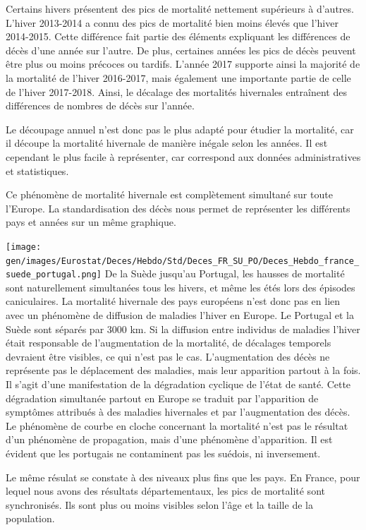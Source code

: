 \documentclass[
]{article}
\begin{document}
Certains hivers présentent des pics de mortalité nettement supérieurs à
d'autres. L'hiver 2013-2014 a connu des pics de mortalité bien moins
élevés que l'hiver 2014-2015. Cette différence fait partie des éléments
expliquant les différences de décès d'une année sur l'autre. De plus,
certaines années les pics de décès peuvent être plus ou moins précoces
ou tardifs. L'année 2017 supporte ainsi la majorité de la mortalité de
l'hiver 2016-2017, mais également une importante partie de celle de
l'hiver 2017-2018. Ainsi, le décalage des mortalités hivernales
entraînent des différences de nombres de décès sur l'année.

Le découpage annuel n'est donc pas le plus adapté pour étudier la
mortalité, car il découpe la mortalité hivernale de manière inégale
selon les années. Il est cependant le plus facile à représenter, car
correspond aux données administratives et statistiques.

Ce phénomène de mortalité hivernale est complètement simultané sur toute
l'Europe. La standardisation des décès nous permet de représenter les
différents pays et années sur un même graphique.

\texttt{[image: gen/images/Eurostat/Deces/Hebdo/Std/Deces\_FR\_SU\_PO/Deces\_Hebdo\_france\_suede\_portugal.png]}
De la Suède jusqu'au Portugal, les hausses de mortalité sont
naturellement simultanées tous les hivers, et même les étés lors des
épisodes caniculaires. La mortalité hivernale des pays européens n'est
donc pas en lien avec un phénomène de diffusion de maladies l'hiver en
Europe. Le Portugal et la Suède sont séparés par 3000 km. Si la
diffusion entre individus de maladies l'hiver était responsable de
l'augmentation de la mortalité, de décalages temporels devraient être
visibles, ce qui n'est pas le cas. L'augmentation des décès ne
représente pas le déplacement des maladies, mais leur apparition partout
à la fois. Il s'agit d'une manifestation de la dégradation cyclique de
l'état de santé. Cette dégradation simultanée partout en Europe se
traduit par l'apparition de symptômes attribués à des maladies
hivernales et par l'augmentation des décès. Le phénomène de courbe en
cloche concernant la mortalité n'est pas le résultat d'un phénomène de
propagation, mais d'une phénomène d'apparition. Il est évident que les
portugais ne contaminent pas les suédois, ni inversement.

Le même résulat se constate à des niveaux plus fins que les pays. En
France, pour lequel nous avons des résultats départementaux, les pics de
mortalité sont synchronisés. Ils sont plus ou moins visibles selon l'âge
et la taille de la population.
\end{document}
